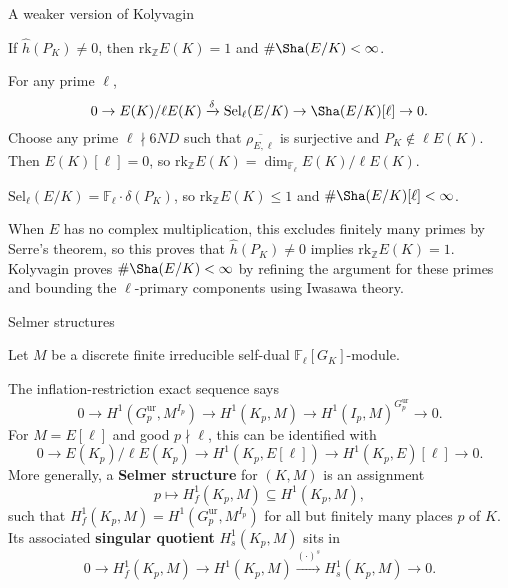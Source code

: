 \documentclass[10pt]{beamer}
\begin{document}
\begin{frame}[t]{A weaker version of Kolyvagin}

\begin{theorem}[Kolyvagin '90]
If $ \widehat{h}(P_K) \ne 0 $, then $ \mathrm{rk}_\mathbb{Z} E(K) = 1 $ and $ \#\Sha(E / K) < \infty $.
\end{theorem}

For any prime $ \ell $,
$$ 0 \to E(K) / \ell E(K) \xrightarrow{\delta} \mathrm{Sel}_\ell(E / K) \to \Sha(E / K)[\ell] \to 0. $$
Choose any prime $ \ell \nmid 6ND $ such that $ \overline{\rho_{E, \ell}} $ is surjective and $ P_K \notin \ell E(K) $. Then $ E(K)[\ell] = 0 $, so $ \mathrm{rk}_{\mathbb{Z}} E(K) = \dim_{\mathbb{F}_\ell} E(K) / \ell E(K) $.

\begin{theorem}
$ \mathrm{Sel}_\ell(E / K) = \mathbb{F}_\ell \cdot \delta(P_K) $, so $ \mathrm{rk}_\mathbb{Z} E(K) \le 1 $ and $ \#\Sha(E / K)[\ell] < \infty $.
\end{theorem}

\vspace{0.5cm} When $ E $ has no complex multiplication, this excludes finitely many primes by Serre's theorem, so this proves that $ \widehat{h}(P_K) \ne 0 $ implies $ \mathrm{rk}_\mathbb{Z} E(K) = 1 $. Kolyvagin proves $ \#\Sha(E / K) < \infty $ by refining the argument for these primes and bounding the $ \ell $-primary components using Iwasawa theory.

\end{frame}

\begin{frame}[t]{Selmer structures}

Let $ M $ be a discrete finite irreducible self-dual $ \mathbb{F}_\ell[G_K] $-module.

\vspace{0.5cm} The inflation-restriction exact sequence says
$$ 0 \to H^1(G_p^{\mathrm{ur}}, M^{I_p}) \to H^1(K_p, M) \to H^1(I_p, M)^{G_p^{\mathrm{ur}}} \to 0. $$
For $ M = E[\ell] $ and good $ p \nmid \ell $, this can be identified with
$$ 0 \to E(K_p) / \ell E(K_p) \to H^1(K_p, E[\ell]) \to H^1(K_p, E)[\ell] \to 0. $$
More generally, a \textbf{Selmer structure} for $ (K, M) $ is an assignment
$$ p \longmapsto H_f^1(K_p, M) \subseteq H^1(K_p, M), $$
such that $ H_f^1(K_p, M) = H^1(G_p^{\mathrm{ur}}, M^{I_p}) $ for all but finitely many places $ p $ of $ K $. Its associated \textbf{singular quotient} $ H_s^1(K_p, M) $ sits in
$$ 0 \to H_f^1(K_p, M) \to H^1(K_p, M) \xrightarrow{(\cdot)^s} H_s^1(K_p, M) \to 0. $$

\end{frame}
\end{document}
